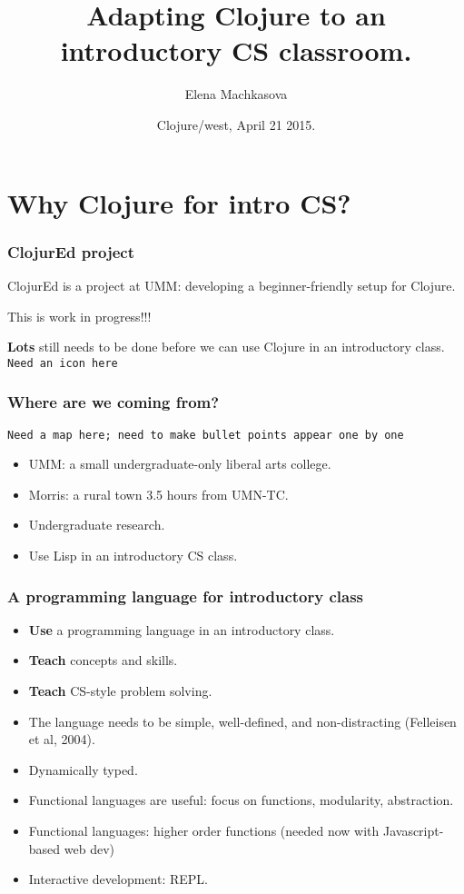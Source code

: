 \documentclass{beamer}
\begin{document}
\title{Adapting Clojure to an introductory CS classroom.}
\author{Elena Machkasova}
\date[]  
{Clojure/west, April 21 2015.}

\begin{frame}
  \titlepage
\end{frame}

\section{Why Clojure for intro CS?}

\begin{frame}
   \frametitle{ClojurEd project}
ClojurEd is a project at UMM: developing a beginner-friendly setup for Clojure. 


This is work in progress!!! 

{\large\bf  Lots}  still needs to be done before we can use Clojure in an introductory class. 
{\tt Need an icon here}
\end{frame}

\begin{frame}
   \frametitle{Where are we coming from?}
{\tt Need a map here; need to make bullet points appear one by one}

\begin{itemize}
\item UMM: a small undergraduate-only liberal arts college.
\item Morris: a rural town 3.5 hours from UMN-TC. 
\item Undergraduate research. 
\item Use Lisp in an introductory CS class. 
\end{itemize}
\end{frame}

\begin{frame}
   \frametitle{A programming language for introductory class}
\begin{itemize}
\item {\bf Use} a programming language in an introductory class.
\item {\bf  Teach} concepts and skills.
\item {\bf  Teach} CS-style problem solving.
\item The language needs to be simple, well-defined, and non-distracting (Felleisen et al, 2004).
\item Dynamically typed.
\item Functional languages are useful: focus on functions, modularity, abstraction.
\item Functional languages: higher order functions (needed now with Javascript-based web dev)
\item Interactive development: REPL. 
\end{itemize}
\end{frame}
\end{document}
